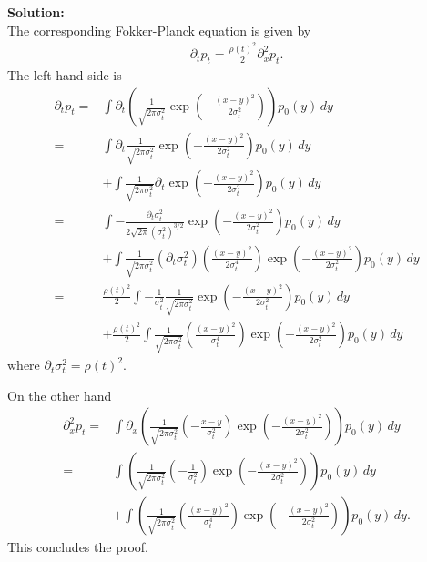 \documentclass[12pt]{article}
\begin{document}
\begin{enumerate}
\begin{solution}
{\bf Solution:}\\
The corresponding Fokker-Planck equation is given by
\begin{align}
    \partial_t p_t = \frac{\rho(t)^2}{2} \partial_x^2 p_t.
\end{align}
The left hand side is
\begin{align}
    \partial_t p_t 
    =& \int \partial_t\left( \frac{1}{\sqrt{2\pi\sigma_t^2}} \exp\left(-\frac{(x-y)^2}{2\sigma_t^2}\right)\right) p_0(y)\, dy\\
    =& \int \partial_t \frac{1}{\sqrt{2\pi\sigma_t^2}} \exp\left(-\frac{(x-y)^2}{2\sigma_t^2}\right) p_0(y)\, dy\nonumber\\
    &+ \int \frac{1}{\sqrt{2\pi\sigma_t^2}} \partial_t \exp\left(-\frac{(x-y)^2}{2\sigma_t^2}\right) p_0(y)\, dy\\
    =& \int  -\frac{\partial_t \sigma_t^2}{2\sqrt{2\pi}(\sigma_t^2)^{3/2}} \exp\left(-\frac{(x-y)^2}{2\sigma_t^2}\right) p_0(y)\, dy\nonumber\\
    &+ \int \frac{1}{\sqrt{2\pi\sigma_t^2}}(\partial_t\sigma_t^2)  \left(\frac{(x-y)^2}{2\sigma_t^4}\right)\exp\left(-\frac{(x-y)^2}{2\sigma_t^2}\right) p_0(y)\, dy\\
    =&\frac{\rho(t)^2}{2} \int  -\frac{1}{\sigma_t^2}\frac{1}{\sqrt{2\pi\sigma_t^2}} \exp\left(-\frac{(x-y)^2}{2\sigma_t^2}\right) p_0(y)\, dy\nonumber\\
    &+ \frac{\rho(t)^2}{2}\int \frac{1}{\sqrt{2\pi\sigma_t^2}}  \left(\frac{(x-y)^2}{\sigma_t^4}\right)\exp\left(-\frac{(x-y)^2}{2\sigma_t^2}\right) p_0(y)\, dy
\end{align}
where $\partial_t \sigma_t^2 = \rho(t)^2$.

On the other hand
\begin{align}
    \partial_x^2 p_t 
    =&  \int \partial_x\left( \frac{1}{\sqrt{2\pi\sigma_t^2}}\left(-\frac{x-y}{\sigma_t^2}\right) \exp\left(-\frac{(x-y)^2}{2\sigma_t^2}\right)\right) p_0(y)\, dy\\
    =&  \int \left( \frac{1}{\sqrt{2\pi\sigma_t^2}}\left(-\frac{1}{\sigma_t^2}\right) \exp\left(-\frac{(x-y)^2}{2\sigma_t^2}\right)\right) p_0(y)\, dy\nonumber\\
    &+  \int \left( \frac{1}{\sqrt{2\pi\sigma_t^2}}\left(\frac{(x-y)^2}{\sigma_t^4}\right) \exp\left(-\frac{(x-y)^2}{2\sigma_t^2}\right)\right) p_0(y)\, dy.
\end{align}
This concludes the proof.


\end{solution}
\end{enumerate}
\end{document}
